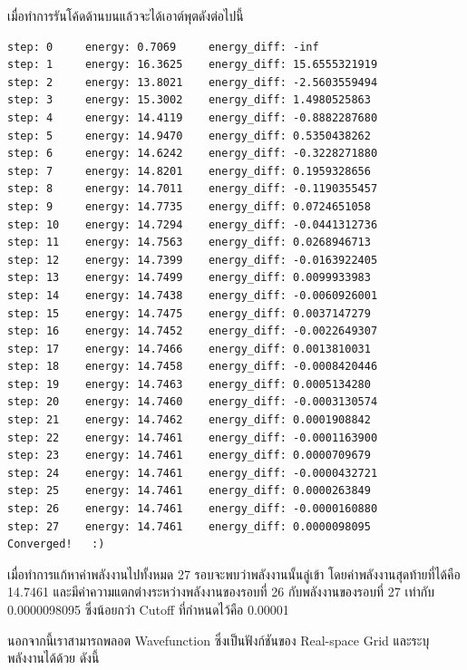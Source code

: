 \vspace{5pt}

\noindent เมื่อทำการรันโค้ดด้านบนแล้วจะได้เอาต์พุตดังต่อไปนี้

\vspace{5pt}

\begin{lstlisting}[style=MyPython]
step: 0     energy: 0.7069     energy_diff: -inf
step: 1     energy: 16.3625    energy_diff: 15.6555321919
step: 2     energy: 13.8021    energy_diff: -2.5603559494
step: 3     energy: 15.3002    energy_diff: 1.4980525863
step: 4     energy: 14.4119    energy_diff: -0.8882287680
step: 5     energy: 14.9470    energy_diff: 0.5350438262
step: 6     energy: 14.6242    energy_diff: -0.3228271880
step: 7     energy: 14.8201    energy_diff: 0.1959328656
step: 8     energy: 14.7011    energy_diff: -0.1190355457
step: 9     energy: 14.7735    energy_diff: 0.0724651058
step: 10    energy: 14.7294    energy_diff: -0.0441312736
step: 11    energy: 14.7563    energy_diff: 0.0268946713
step: 12    energy: 14.7399    energy_diff: -0.0163922405
step: 13    energy: 14.7499    energy_diff: 0.0099933983
step: 14    energy: 14.7438    energy_diff: -0.0060926001
step: 15    energy: 14.7475    energy_diff: 0.0037147279
step: 16    energy: 14.7452    energy_diff: -0.0022649307
step: 17    energy: 14.7466    energy_diff: 0.0013810031
step: 18    energy: 14.7458    energy_diff: -0.0008420446
step: 19    energy: 14.7463    energy_diff: 0.0005134280
step: 20    energy: 14.7460    energy_diff: -0.0003130574
step: 21    energy: 14.7462    energy_diff: 0.0001908842
step: 22    energy: 14.7461    energy_diff: -0.0001163900
step: 23    energy: 14.7461    energy_diff: 0.0000709679
step: 24    energy: 14.7461    energy_diff: -0.0000432721
step: 25    energy: 14.7461    energy_diff: 0.0000263849
step: 26    energy: 14.7461    energy_diff: -0.0000160880
step: 27    energy: 14.7461    energy_diff: 0.0000098095
Converged!   :)
\end{lstlisting}

\vspace{5pt}

เมื่อทำการแก้หาค่าพลังงานไปทั้งหมด 27 รอบจะพบว่าพลังงานนั้นลู่เข้า โดยค่าพลังงานสุดท้ายที่ได้คือ 14.7461 และมีค่าความแตกต่างระหว่างพลังงานของรอบที่ 26 กับพลังงานของรอบที่ 27 เท่ากับ 0.0000098095 ซึ่งน้อยกว่า Cutoff ที่กำหนดไว้คือ 0.00001

นอกจากนี้เราสามารถพลอต Wavefunction ซึ่งเป็นฟังก์ชันของ Real-space Grid และระบุพลังงานได้ด้วย ดังนี้

\vspace{5pt}

